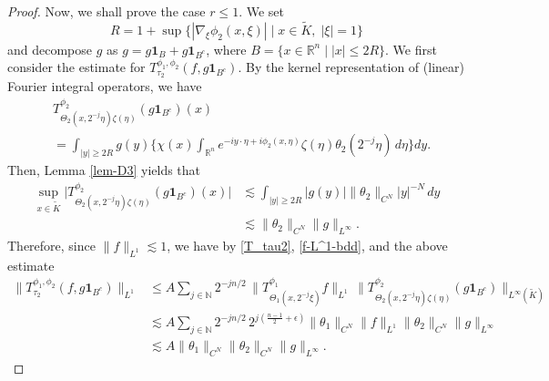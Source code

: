 \documentclass[12pt]{amsart}
\numberwithin{equation}{section}
\theoremstyle{plain}
\theoremstyle{definition}
\newcommand{\ichi}{\mathbf{1}}
\newcommand{\N}{\mathbb{N}}
\newcommand{\R}{\mathbb{R}}
\begin{document}
\begin{proof}
Now, we shall prove the case $r \le 1$.
We set 
\[
R = 1+ \sup \{ |\nabla_{\xi} \phi_2 (x, \xi)| 
\mid x \in \widetilde{K}, \; |\xi|=1 \}
\]
and decompose 
$g$ as $g=g\ichi_{B}+g\ichi_{B^c}$,
where
$B=\{x \in \R^n \mid |x|\le 2R\}$. 
We first consider the estimate
for $T_{ \tau_2 }^{\phi_1, \phi_2} (f, g\ichi_{B^c})$.
By the kernel representation of 
(linear) Fourier integral operators,
we have
\begin{align*}&
T^{\phi_2}_{ \Theta_2 (x, 2^{-j} \eta) \zeta(\eta) } (g\ichi_{B^c})(x)
\\&= 
\int_{|y| \ge 2R} g(y) 
\Big\{ \chi(x) 
\int_{\R^n} e^{-i y \cdot \eta + i \phi_2 (x, \eta)} 
\zeta(\eta) \theta_2 (2^{-j}\eta) \,d\eta \Big\}
dy .
\end{align*}
Then, Lemma \ref{lem-D3} yields that
\begin{align*}
\sup_{x \in \widetilde{K}}
\big| T^{\phi_2}_{ \Theta_2 (x, 2^{-j} \eta) \zeta(\eta) } (g\ichi_{B^c})(x) \big|
&\lesssim
\int_{|y| \ge 2R} | g(y) | 
\|\theta_2\|_{C^N} |y|^{-N} 
\,dy
\\&\lesssim 
\|\theta_2\|_{C^N} \|g\|_{L^\infty} .
\end{align*}
Therefore, since $\|f\|_{L^1} \lesssim 1$, we have by 
\eqref{T_tau2}, 
\eqref{f-L^1-bdd}, and 
the above estimate
\begin{align*}
\| T_{ \tau_2 }^{\phi_1, \phi_2} (f, g\ichi_{B^c}) \|_{L^1}
&\le A
\sum_{j \in \N } 
2^{-j n/2} \,
\| T^{\phi_1}_{ \Theta_1 (x, 2^{-j} \xi) } f \|_{L^1} \,
\| T^{\phi_2}_{ \Theta_2 (x, 2^{-j} \eta) \zeta(\eta) } (g\ichi_{B^c}) \|_{L^{\infty}(\widetilde{K})} 
\\&\lesssim A
\sum_{j \in \N } 
2^{-j n/2} \, 2^{j(\frac{n-1}{2} + \epsilon)} 
\| \theta_1 \|_{ C^N } \|f\|_{L^1}
\| \theta_2 \|_{ C^N } \|g\|_{L^\infty}
\\&\lesssim A
\| \theta_1 \|_{ C^N } \| \theta_2 \|_{ C^N } 
\|g\|_{L^\infty} .
\end{align*}



\end{proof}
\end{document}
